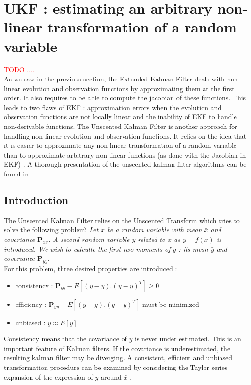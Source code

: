 \documentclass[10pt,oneside]{scrartcl}
\newcommand\matrice[1]{\mathbf#1}
\begin{document}
\vfill
\pagebreak

\section{UKF : estimating an arbitrary non-linear transformation of a random variable}

\textcolor{red}{TODO ....}\\

As we saw in the previous section, the Extended Kalman Filter deals
with non-linear evolution and observation functions by approximating
them at the first order. It also requires to be able to compute the
jacobian of these functions. This leads to two flaws of EKF :
approximation errors when the evolution and observation functions are
not locally linear and the inability of EKF to handle non-derivable
functions. The Unscented Kalman Filter is another approach for
handling non-linear evolution and observation functions. It relies on
the idea that it is easier to approximate any non-linear
transformation of a random variable than to approximate arbitrary
non-linear functions (as done with the Jacobian in EKF)
\cite{Julier2004}. A thorough presentation of the unscented kalman filter algorithms can be found in \cite{Merwe2004}.

\subsection{Introduction}

The Unscented Kalman Filter relies on the Unscented Transform which
tries to solve the following problem\~: \emph{Let $x$ be a random variable
  with mean $\bar{x}$ and covariance $\matrice{P}_{xx}$. A second
  random variable $y$ related to $x$ as $y = f(x)$ is introduced. We wish to calculte the first two moments of $y$ : its mean $\bar{y}$ and covariance $\matrice{P}_{yy}$}.\\

For this problem, three desired properties are introduced :
\begin{itemize}
\item consistency : $\matrice{P}_{yy} - E[(y-\bar{y}).(y-\bar{y})^T]
  \geq 0$
\item efficiency : $\matrice{P}_{yy} - E[(y-\bar{y}).(y-\bar{y})^T]$
  must be minimized
\item unbiased : $\bar{y} \approx E[y]$
\end{itemize}

Consistency means that the covariance of $y$ is never under
estimated. This is an important feature of Kalman filters. If the
covariance is underestimated, the resulting kalman filter may be
diverging. A consistent, efficient and unbiased transformation
procedure can be examined by considering the Taylor series expansion
of the expression of $y$ around $\bar{x}$ \cite{Julier1997}.\\
\end{document}
